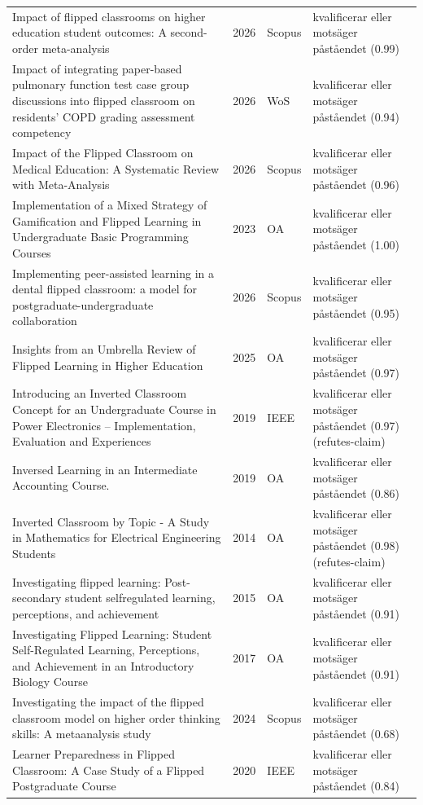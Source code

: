 \begin{longtable}{@{}%
  >{\raggedright\arraybackslash}p{}c%
  >{\raggedright\arraybackslash}p{}%
  >{\raggedright\arraybackslash}p{}@{}}
Impact of flipped classrooms on higher education student outcomes: A second-order meta-analysis & 2026 & Scopus & kvalificerar eller motsäger påståendet (0.99) \\
Impact of integrating paper-based pulmonary function test case group discussions into flipped classroom on residents' COPD grading assessment competency & 2026 & WoS & kvalificerar eller motsäger påståendet (0.94) \\
Impact of the Flipped Classroom on Medical Education: A Systematic Review with Meta-Analysis & 2026 & Scopus & kvalificerar eller motsäger påståendet (0.96) \\
Implementation of a Mixed Strategy of Gamification and Flipped Learning in Undergraduate Basic Programming Courses & 2023 & OA & kvalificerar eller motsäger påståendet (1.00) \\
Implementing peer-assisted learning in a dental flipped classroom: a model for postgraduate-undergraduate collaboration & 2026 & Scopus & kvalificerar eller motsäger påståendet (0.95) \\
Insights from an Umbrella Review of Flipped Learning in Higher Education & 2025 & OA & kvalificerar eller motsäger påståendet (0.97) \\
Introducing an Inverted Classroom Concept for an Undergraduate Course in Power Electronics -- Implementation, Evaluation and Experiences & 2019 & IEEE & kvalificerar eller motsäger påståendet (0.97) (refutes-claim) \\
Inversed Learning in an Intermediate Accounting Course. & 2019 & OA & kvalificerar eller motsäger påståendet (0.86) \\
Inverted Classroom by Topic - A Study in Mathematics for Electrical Engineering Students & 2014 & OA & kvalificerar eller motsäger påståendet (0.98) (refutes-claim) \\
Investigating flipped learning: Post-secondary student selfregulated learning, perceptions, and achievement & 2015 & OA & kvalificerar eller motsäger påståendet (0.91) \\
Investigating Flipped Learning: Student Self-Regulated Learning, Perceptions, and Achievement in an Introductory Biology Course & 2017 & OA & kvalificerar eller motsäger påståendet (0.91) \\
Investigating the impact of the flipped classroom model on higher order thinking skills: A metaanalysis study & 2024 & Scopus & kvalificerar eller motsäger påståendet (0.68) \\
Learner Preparedness in Flipped Classroom: A Case Study of a Flipped Postgraduate Course & 2020 & IEEE & kvalificerar eller motsäger påståendet (0.84) \\

\end{longtable}
